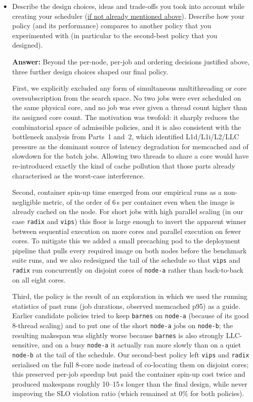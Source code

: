 \begin{enumerate}
\begin{enumerate}
\begin{itemize}
        \item Describe the design choices, ideas and trade-offs you took into account while creating your scheduler (\underline{if not already mentioned above}). Describe how your policy (and its performance) compares to another policy that you experimented with (in particular to the second-best policy that you designed).

        \textbf{Answer:}
        Beyond the per-node, per-job and ordering decisions justified above, three further design choices shaped our final policy.

        First, we explicitly excluded any form of simultaneous multithreading or core oversubscription from the search space. No two jobs were ever scheduled on the same physical core, and no job was ever given a thread count higher than its assigned core count. The motivation was twofold: it sharply reduces the combinatorial space of admissible policies, and it is also consistent with the bottleneck analysis from Parts~1 and~2, which identified L1d/L1i/L2/LLC pressure as the dominant source of latency degradation for memcached and of slowdown for the batch jobs. Allowing two threads to share a core would have re-introduced exactly the kind of cache pollution that those parts already characterised as the worst-case interference.

        Second, container spin-up time emerged from our empirical runs as a non-negligible metric, of the order of 6\,s per container even when the image is already cached on the node. For short jobs with high parallel scaling (in our case \texttt{radix} and \texttt{vips}) this floor is large enough to invert the apparent winner between sequential execution on more cores and parallel execution on fewer cores. To mitigate this we added a small precaching pod to the deployment pipeline that pulls every required image on both nodes before the benchmark suite runs, and we also redesigned the tail of the schedule so that \texttt{vips} and \texttt{radix} run concurrently on disjoint cores of \texttt{node-a} rather than back-to-back on all eight cores.

        Third, the policy is the result of an exploration in which we used the running statistics of past runs (job durations, observed memcached p95) as a guide. Earlier candidate policies tried to keep \texttt{barnes} on \texttt{node-a} (because of its good 8-thread scaling) and to put one of the short \texttt{node-a} jobs on \texttt{node-b}; the resulting makespan was slightly worse because \texttt{barnes} is also strongly LLC-sensitive, and on a busy \texttt{node-a} it actually ran more slowly than on a quiet \texttt{node-b} at the tail of the schedule. Our second-best policy left \texttt{vips} and \texttt{radix} serialised on the full 8-core node instead of co-locating them on disjoint cores; this preserved per-job speedup but paid the container spin-up cost twice and produced makespans roughly 10--15\,s longer than the final design, while never improving the SLO violation ratio (which remained at $0\%$ for both policies).
        \\



\end{itemize}
\end{enumerate}
\end{enumerate}
